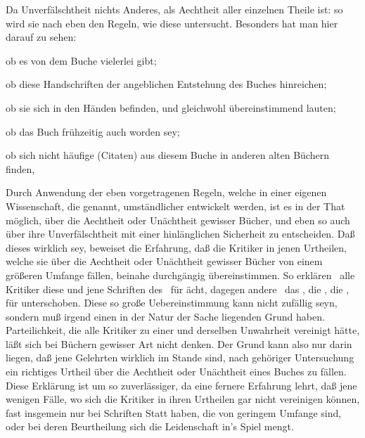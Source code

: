 \begin{aufza}
\item  Da Unverfälschtheit nichts Anderes, als Aechtheit aller einzelnen Theile ist: so wird sie nach eben den Regeln, wie diese untersucht. Besonders hat man hier darauf zu sehen:
\begin{aufzb}
\item  ob es von dem Buche vielerlei  gibt;
\item  ob diese Handschriften  der angeblichen Entstehung des Buches hinreichen;
\item  ob sie sich in den Händen  befinden, und gleichwohl übereinstimmend lauten;
\item  ob das Buch frühzeitig auch  worden sey;
\item  ob sich nicht häufige  (Citaten) aus diesem Buche in anderen alten Büchern finden, \usw ~ 
\end{aufzb}
\end{aufza}


Durch Anwendung der eben vorgetragenen Regeln, welche in einer eigenen Wissenschaft, die  genannt, umständlicher entwickelt werden, ist es in der That möglich, über die Aechtheit oder Unächtheit gewisser Bücher, und eben so auch über ihre Unverfälschtheit mit einer hinlänglichen Sicherheit zu entscheiden. Daß dieses wirklich sey, beweiset die Erfahrung, daß die Kritiker in jenen Urtheilen, welche sie über die Aechtheit oder Unächtheit gewisser Bücher von einem größeren Umfange fällen, beinahe durchgängig übereinstimmen. So erklären \zB\ alle Kritiker diese und jene Schriften des  \usw\ für ächt, dagegen andere \zB\ das , die , die , für unterschoben. Diese so große Uebereinstimmung kann nicht zufällig seyn, sondern muß irgend einen in der Natur der Sache liegenden Grund haben. Parteilichkeit, die alle Kritiker zu einer und derselben Unwahrheit vereinigt hätte, läßt sich bei Büchern gewisser Art nicht denken. Der Grund kann also nur darin liegen, daß jene Gelehrten wirklich im Stande sind, nach gehöriger Untersuchung ein richtiges Urtheil über die Aechtheit oder Unächtheit eines Buches zu fällen. Diese Erklärung ist um so zuverlässiger, da eine fernere Erfahrung lehrt, daß jene wenigen Fälle, wo sich die Kritiker in ihren Urtheilen gar nicht vereinigen können, fast insgemein nur bei Schriften Statt haben, die von geringem Umfange sind, oder bei deren Beurtheilung sich die Leidenschaft in's Spiel mengt.

